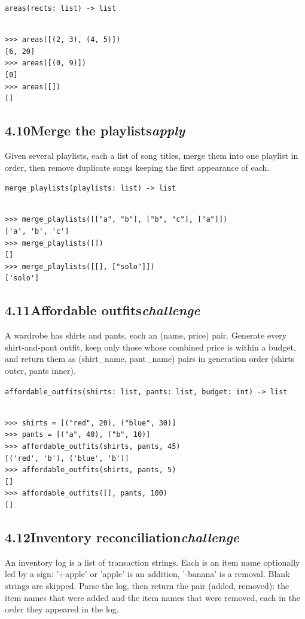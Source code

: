 \documentclass[10pt,letterpaper]{book}
\begin{document}
\noindent\texttt{areas(rects: list) -> list}
\begin{lstlisting}[style=ex]

>>> areas([(2, 3), (4, 5)])
[6, 20]
>>> areas([(0, 9)])
[0]
>>> areas([])
[]

\end{lstlisting}
\subsection*{4.10\quad Merge the playlists\hfill\textnormal{\textit{apply}}}
Given several playlists, each a list of song titles, merge them into one playlist in order, then remove duplicate songs keeping the first appearance of each.

\noindent\texttt{merge\_playlists(playlists: list) -> list}
\begin{lstlisting}[style=ex]

>>> merge_playlists([["a", "b"], ["b", "c"], ["a"]])
['a', 'b', 'c']
>>> merge_playlists([])
[]
>>> merge_playlists([[], ["solo"]])
['solo']

\end{lstlisting}
\subsection*{4.11\quad Affordable outfits\hfill\textnormal{\textit{challenge}}}
A wardrobe has shirts and pants, each an (name, price) pair. Generate every shirt-and-pant outfit, keep only those whose combined price is within a budget, and return them as (shirt\_name, pant\_name) pairs in generation order (shirts outer, pants inner).

\noindent\texttt{affordable\_outfits(shirts: list, pants: list, budget: int) -> list}
\begin{lstlisting}[style=ex]

>>> shirts = [("red", 20), ("blue", 30)]
>>> pants = [("a", 40), ("b", 10)]
>>> affordable_outfits(shirts, pants, 45)
[('red', 'b'), ('blue', 'b')]
>>> affordable_outfits(shirts, pants, 5)
[]
>>> affordable_outfits([], pants, 100)
[]

\end{lstlisting}
\subsection*{4.12\quad Inventory reconciliation\hfill\textnormal{\textit{challenge}}}
An inventory log is a list of transaction strings. Each is an item name optionally led by a sign: '+apple' or 'apple' is an addition, '-banana' is a removal. Blank strings are skipped. Parse the log, then return the pair (added, removed): the item names that were added and the item names that were removed, each in the order they appeared in the log.
\end{document}
